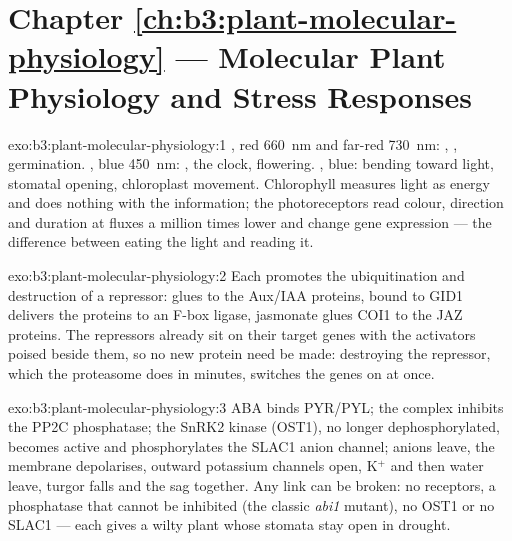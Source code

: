 \section*{Chapter \ref{ch:b3:plant-molecular-physiology} --- Molecular Plant Physiology and Stress Responses}

\begin{solution}{exo:b3:plant-molecular-physiology:1}
, red \qty{660}{nm} and far-red \qty{730}{nm}:
, , germination. , blue
\qty{450}{nm}: , the clock, flowering. , blue:
bending toward light, stomatal opening, chloroplast movement.
Chlorophyll measures light as energy and does nothing with the
information; the photoreceptors read colour, direction and duration at
fluxes a million times lower and change gene expression --- the
difference between eating the light and reading it.
\end{solution}

\begin{solution}{exo:b3:plant-molecular-physiology:2}
Each  promotes the ubiquitination and destruction of a
repressor:  glues  to the Aux/IAA proteins,  bound
to GID1 delivers the  proteins to an F-box ligase, jasmonate glues
COI1 to the JAZ proteins. The repressors already sit on their target
genes with the activators poised beside them, so no new protein need
be made: destroying the repressor, which the proteasome does in
minutes, switches the genes on at once.
\end{solution}

\begin{solution}{exo:b3:plant-molecular-physiology:3}
ABA binds PYR/PYL; the complex inhibits the PP2C phosphatase; the
SnRK2 kinase (OST1), no longer dephosphorylated, becomes active and
phosphorylates the SLAC1 anion channel; anions leave, the membrane
depolarises, outward potassium channels open, K$^{+}$ and then water
leave, turgor falls and the  sag together. Any link can be
broken: no receptors, a phosphatase that cannot be inhibited (the
classic \emph{abi1} mutant), no OST1 or no SLAC1 --- each gives a wilty
plant whose stomata stay open in drought.
\end{solution}

